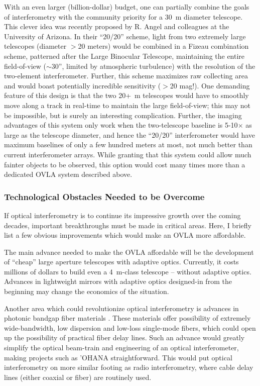 \documentclass[12pt]{article}
\begin{document}
With an even larger (billion-dollar) budget, one can partially combine
the goals of interferometry with the community priority for a 30~m
diameter telescope.  This clever idea was recently proposed by R.
Angel and colleagues at the University of Arizona.  In their ``20/20''
scheme, light from two extremely large telescopes (diameter $>$20
meters) would be combined in a Fizeau combination scheme, patterned
after the Large Binocular Telescope, maintaining the entire
field-of-view ($\sim$30'', limited by atmospheric turbulence) with the
resolution of the two-element interferometer.  Further, this scheme
maximizes raw collecting area and would boast potentially incredible
sensitivity ($>$20 mag!).  One demanding feature of this design is
that the two 20+~m telescopes would have to smoothly move along a
track in real-time to maintain the large field-of-view; this may not
be impossible, but is surely an interesting complication.  Further,
the imaging advantages of this system only work when the two-telescope
baseline is 5-10$\times$ as large as the telescope diameter, and hence
the ``20/20'' interferometer would have maximum baselines of only a
few hundred meters at most, not much better than current
interferometer arrays.  While granting that this system could allow
much fainter objects to be observed, this option would cost many times
more than a dedicated OVLA system described above.

\subsubsection{Technological Obstacles Needed to be Overcome}
If optical interferometry is to continue its impressive growth over
the coming decades, important breakthroughs must be made in critical
areas.  Here, I briefly list a few obvious improvements
which would make an OVLA more affordable.

The main advance needed to make the OVLA affordable will be the
development of ``cheap'' large aperture telescopes with adaptive
optics.  Currently, it costs millions of dollars to build even a
4~m-class telescope -- without adaptive optics.  Advances in lightweight
mirrors with adaptive optics designed-in from the beginning may change
the economics of the situation.  

Another area which could revolutionize optical interferometry is
advances in photonic bandgap fiber materials
\citep[e.g.,][]{mueller2002}.  These materials offer possibility of
extremely wide-bandwidth, low dispersion and low-loss single-mode
fibers, which could open up the possibility of practical fiber delay
lines. Such an advance would greatly simplify the optical beam-train
and engineering of an optical interferometer, making projects such as
'OHANA straightforward.  This would put optical interferometry on more similar
footing as radio interferometry, where cable delay lines (either
coaxial or fiber) are routinely used.
\end{document}
